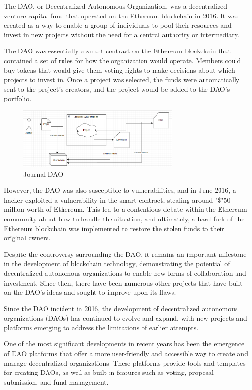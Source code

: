 \documentclass[lettersize,journal]{IEEEtran}
\begin{document}
The DAO, or Decentralized Autonomous Organization, was a decentralized venture capital fund that operated on the Ethereum blockchain in 2016. It was created as a way to enable a group of individuals to pool their resources and invest in new projects without the need for a central authority or intermediary.

The DAO was essentially a smart contract on the Ethereum blockchain that contained a set of rules for how the organization would operate. Members could buy tokens that would give them voting rights to make decisions about which projects to invest in. Once a project was selected, the funds were automatically sent to the project's creators, and the project would be added to the DAO's portfolio.


\begin{figure}[h]
  \centering
  \includegraphics[width=3.2in]{assets/jdao.png}
  \caption{Journal DAO}
\end{figure}

However, the DAO was also susceptible to vulnerabilities, and in June 2016, a hacker exploited a vulnerability in the smart contract, stealing around "\$"50 million worth of Ethereum. This led to a contentious debate within the Ethereum community about how to handle the situation, and ultimately, a hard fork of the Ethereum blockchain was implemented to restore the stolen funds to their original owners.

Despite the controversy surrounding the DAO, it remains an important milestone in the development of blockchain technology, demonstrating the potential of decentralized autonomous organizations to enable new forms of collaboration and investment. Since then, there have been numerous other projects that have built on the DAO's ideas and sought to improve upon its flaws.

Since the DAO incident in 2016, the development of decentralized autonomous organizations (DAOs) has continued to evolve and expand, with new projects and platforms emerging to address the limitations of earlier attempts.

One of the most significant developments in recent years has been the emergence of DAO platforms that offer a more user-friendly and accessible way to create and manage decentralized organizations. These platforms provide tools and templates for creating DAOs, as well as built-in features such as voting, proposal submission, and fund management.
\end{document}
